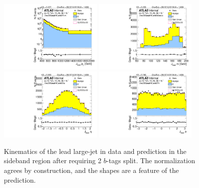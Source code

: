 \clearpage

\begin{figure}[htbp!]
\begin{center}
\includegraphics[width=0.45\textwidth,angle=-90]{figures/boosted/Sideband/b77_TwoTag_split_Sideband_leadHCand_Pt_m_1.pdf}
\includegraphics[width=0.45\textwidth,angle=-90]{figures/boosted/Sideband/b77_TwoTag_split_Sideband_leadHCand_Mass_s.pdf}\\
\includegraphics[width=0.45\textwidth,angle=-90]{figures/boosted/Sideband/b77_TwoTag_split_Sideband_leadHCand_Eta.pdf}
\includegraphics[width=0.45\textwidth,angle=-90]{figures/boosted/Sideband/b77_TwoTag_split_Sideband_leadHCand_Phi.pdf}
  \caption{Kinematics of the lead large-\R jet in data and prediction in the sideband region after requiring 2 $b$-tags split. The normalization agrees by construction, and the shapes are a feature of the prediction.}
  \label{fig:boosted-2bs-sideband-ak10-lead}
\end{center}
\end{figure}

